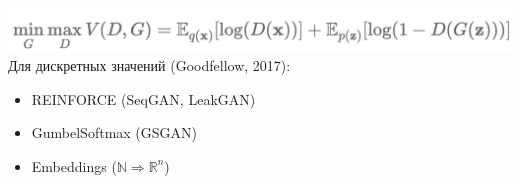 \documentclass[10pt]{beamer}
\begin{document}
\begin{frame}
\begin{columns}
\begin{column}{0.65\textwidth}
\begin{center}
            \includegraphics[width=\textwidth]{images/gan_loss.png}\\
            \vskip2mm
            Для дискретных значений (Goodfellow, 2017):
            \begin{itemize}
                \item REINFORCE (SeqGAN, LeakGAN)
                \item GumbelSoftmax (GSGAN)
                \item Embeddings ($\mathbb{N} \Rightarrow \mathbb{R}^n$)
            \end{itemize}
        \end{center}
    \end{column}
\end{columns}

\end{frame}
\end{document}
